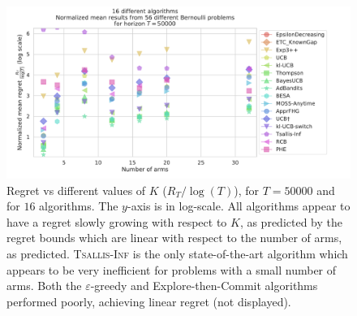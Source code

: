 \begin{figure}[h!]  %
	\includegraphics[width=1.10\linewidth]{16_different_algorithms__lognormregret_vs_arms__56pb__7Ks_T50000.pdf}
	\caption[Regret vs different values of $K$.]{
        Regret vs different values of $K$ ($R_T / \log(T)$),
        for $T=50000$ and for $16$ algorithms.
        The $y$-axis is in log-scale.
        All algorithms appear to have a regret slowly growing with respect to $K$, as predicted by the regret bounds which are linear with respect to the number of arms, as predicted.
        \textsc{Tsallis-Inf} is the only state-of-the-art algorithm which appears to be very inefficient for problems with a small number of arms.
        Both the $\varepsilon$-greedy and Explore-then-Commit algorithms performed poorly, achieving linear regret (not displayed).
	}
	\label{fig:3:16_different_algorithms__lognormregret_vs_arms__56pb__7Ks_T50000}
\end{figure}

